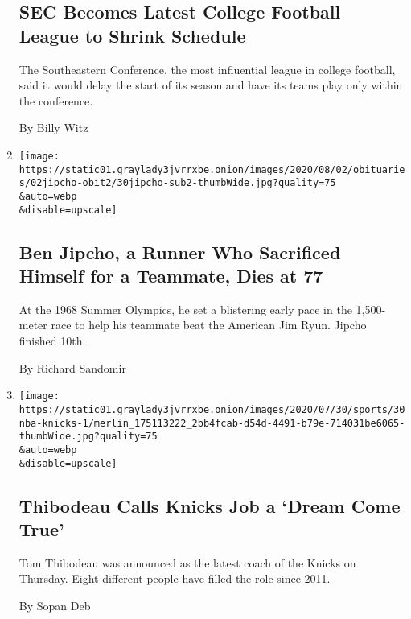 \begin{enumerate}
  \hypertarget{sec-becomes-latest-college-football-league-to-shrink-schedule}{%
  \subsection{SEC Becomes Latest College Football League to Shrink
  Schedule}\label{sec-becomes-latest-college-football-league-to-shrink-schedule}}

  The Southeastern Conference, the most influential league in college
  football, said it would delay the start of its season and have its
  teams play only within the conference.

  By Billy Witz
\item
  \href{/2020/07/30/sports/olympics/ben-jipcho-dead.html}{}

  \texttt{[image: https://static01.graylady3jvrrxbe.onion/images/2020/08/02/obituaries/02jipcho-obit2/30jipcho-sub2-thumbWide.jpg?quality=75\\\&auto=webp\\\&disable=upscale]}

  \hypertarget{ben-jipcho-a-runner-who-sacrificed-himself-for-a-teammate-dies-at-77}{%
  \subsection{Ben Jipcho, a Runner Who Sacrificed Himself for a
  Teammate, Dies at
  77}\label{ben-jipcho-a-runner-who-sacrificed-himself-for-a-teammate-dies-at-77}}

  At the 1968 Summer Olympics, he set a blistering early pace in the
  1,500-meter race to help his teammate beat the American Jim Ryun.
  Jipcho finished 10th.

  By Richard Sandomir
\item
  \href{/2020/07/30/sports/basketball/nba-knicks-coach-tom-thibodeau.html}{}

  \texttt{[image: https://static01.graylady3jvrrxbe.onion/images/2020/07/30/sports/30nba-knicks-1/merlin\_175113222\_2bb4fcab-d54d-4491-b79e-714031be6065-thumbWide.jpg?quality=75\\\&auto=webp\\\&disable=upscale]}

  \hypertarget{thibodeau-calls-knicks-job-a-dream-come-true}{%
  \subsection{Thibodeau Calls Knicks Job a `Dream Come
  True'}\label{thibodeau-calls-knicks-job-a-dream-come-true}}

  Tom Thibodeau was announced as the latest coach of the Knicks on
  Thursday. Eight different people have filled the role since 2011.

  By Sopan Deb
\end{enumerate}

